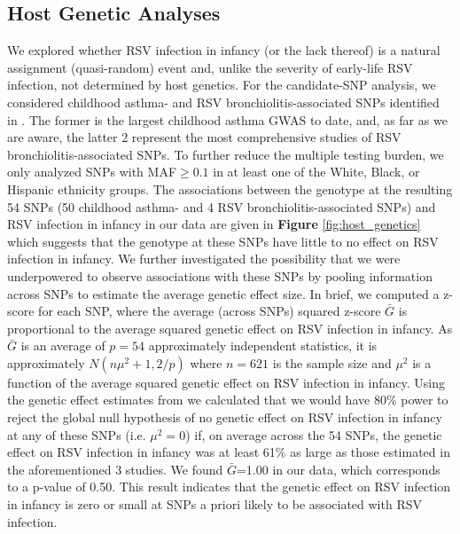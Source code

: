 \documentclass{article} %
\begin{document}
\clearpage	

\subsection{Host Genetic Analyses}
We explored whether RSV infection in infancy (or the lack thereof) is a natural assignment (quasi-random) event and, unlike the severity of early-life RSV infection,
\citep{larkin2015genes}
not determined by host genetics. 
For the candidate-SNP analysis, we considered childhood asthma- and RSV bronchiolitis-associated SNPs identified in 
\citet{pividori2019shared, janssen2007genetic, pasanen2017genome}.
The former is the largest childhood asthma GWAS to date, and, as far as we are aware, the latter 2 represent the most comprehensive studies of RSV bronchiolitis-associated SNPs. 
To further reduce the multiple testing burden, we only analyzed SNPs with MAF$\ge 0.1$ in at least one of the White, Black, or Hispanic ethnicity groups. 
The associations between the genotype at the resulting 54 SNPs (50 childhood asthma- and 4 RSV bronchiolitis-associated SNPs) and RSV infection in infancy in our data are given in 
\textbf{Figure} \ref{fig:host_genetics}
which suggests that the genotype at these SNPs have little to no effect on RSV infection in infancy. 
We further investigated the possibility that we were underpowered to observe associations with these SNPs by pooling information across SNPs to estimate the average genetic effect size. 
In brief, we computed a z-score for each SNP, where the average (across SNPs) squared z-score $\bar{G}$ is proportional to the average squared genetic effect on RSV infection in infancy. 
As $\bar{G}$ is an average of $p=54$ approximately independent statistics, 
it is approximately
$N(n\mu^2 + 1,2/p)$
where $n=621$ is the sample size and $\mu^2$ is a function of the average squared genetic effect on RSV infection in infancy. 
Using the genetic effect estimates from 
\citet{pividori2019shared, janssen2007genetic, pasanen2017genome}
we calculated that we would have 80\% power to reject the global null hypothesis of no genetic effect on RSV infection in infancy at any of these SNPs (i.e. $\mu^2 =0$) if, on average across the 54 SNPs, the genetic effect on RSV infection in infancy was at least 61\% as large as those estimated in the aforementioned 3 studies. 
We found $\bar{G}$=1.00 in our data, which corresponds to a p-value of 0.50. 
This result indicates that the genetic effect on RSV infection in infancy is zero or small at SNPs a priori likely to be associated with RSV infection.	
\end{document}
